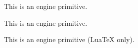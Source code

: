 \begin{function}[]
  {
  }
  \begin{syntax}
  \end{syntax}

\end{function}



\begin{function}[]
  {
    \openup
  }
  \begin{syntax}
  \end{syntax}

\end{function}



\begin{function}[]
  {
    \operator@font
  }
  \begin{syntax}
  \end{syntax}

\end{function}



\begin{function}[]
  {
    \optional@arg
  }
  \begin{syntax}
  \end{syntax}

\end{function}



\begin{function}[]
  {
    \or
  }
  \begin{syntax}
  \end{syntax}
  This is an engine primitive.
\end{function}



\begin{variable}
  {
    \output
  }
  This is an engine primitive.
\end{variable}



\begin{function}[]
  {
    \outputmode
  }
  \begin{syntax}
  \end{syntax}
  This is an engine primitive (Lua\TeX{} only).
\end{function}



